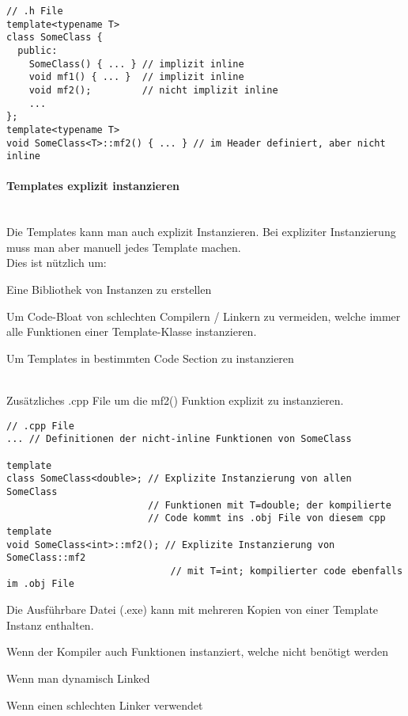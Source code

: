 \begin{lstlisting}
// .h File
template<typename T>
class SomeClass {
  public:
    SomeClass() { ... } // implizit inline
    void mf1() { ... }  // implizit inline
    void mf2();         // nicht implizit inline
    ...
};
template<typename T>
void SomeClass<T>::mf2() { ... } // im Header definiert, aber nicht inline
\end{lstlisting}


\paragraph{Templates explizit instanzieren}~
\\
Die Templates kann man auch explizit Instanzieren. Bei expliziter Instanzierung muss man aber manuell jedes Template machen.\\

Dies ist nützlich um:
\begin{compactitem}
	\item Eine Bibliothek von Instanzen zu erstellen
	\item Um Code-Bloat von schlechten Compilern / Linkern zu vermeiden, welche immer alle Funktionen einer Template-Klasse instanzieren.
	\item Um Templates in bestimmten Code Section zu instanzieren
\end{compactitem}~\\

Zusätzliches .cpp File um die mf2() Funktion explizit zu instanzieren.
\begin{lstlisting}
// .cpp File
... // Definitionen der nicht-inline Funktionen von SomeClass

template
class SomeClass<double>; // Explizite Instanzierung von allen SomeClass
                         // Funktionen mit T=double; der kompilierte
                         // Code kommt ins .obj File von diesem cpp
template
void SomeClass<int>::mf2(); // Explizite Instanzierung von SomeClass::mf2
                             // mit T=int; kompilierter code ebenfalls im .obj File
\end{lstlisting}

Die Ausführbare Datei (.exe) kann mit mehreren Kopien von einer Template Instanz enthalten. 
\begin{compactitem}
    \item Wenn der Kompiler auch Funktionen instanziert, welche nicht benötigt werden
    \item Wenn man dynamisch Linked
    \item Wenn einen schlechten Linker verwendet
\end{compactitem}

